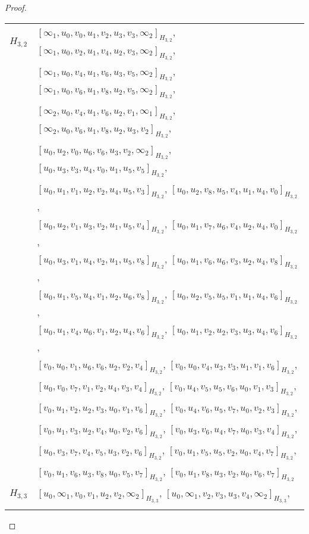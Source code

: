 \begin{subappendices}
\begin{proof}
{ \small
\begin{longtable}{|c|l|}
\hline
$H_{3,2}$ &
  $[\infty_1, u_0, v_0, u_1, v_2, u_3, v_3, \infty_2]_{H_{3,2}}$,
  $[\infty_1, u_0, v_2, u_1, v_4, u_2, v_3, \infty_2]_{H_{3,2}}$, \\* &
  $[\infty_1, u_0, v_4, u_1, v_6, u_3, v_5, \infty_2]_{H_{3,2}}$,
  $[\infty_1, u_0, v_6, u_1, v_8, u_2, v_5, \infty_2]_{H_{3,2}}$, \\* &
  $[\infty_2, u_0, v_4, u_1, v_6, u_2, v_1, \infty_1]_{H_{3,2}}$,
  $[\infty_2, u_0, v_6, u_1, v_8, u_2, u_3, v_2]_{H_{3,2}}$, \\* &
  $[u_0, u_2, v_0, u_6, v_6, u_3, v_2, \infty_2]_{H_{3,2}}$,
  $[u_0, u_3, v_3, u_4, v_0, u_1, u_5, v_5]_{H_{3,2}}$, \\* &
  $[u_0, u_1, v_1, u_2, v_2, u_4, u_5, v_3]_{H_{3,2}}$,
  $[u_0, u_2, v_8, u_5, v_4, u_1, u_4, v_0]_{H_{3,2}}$, \\* &
  $[u_0, u_2, v_1, u_3, v_2, u_1, u_5, v_4]_{H_{3,2}}$,
  $[u_0, u_1, v_7, u_6, v_4, u_2, u_4, v_0]_{H_{3,2}}$, \\* &
  $[u_0, u_3, v_1, u_4, v_2, u_1, u_5, v_8]_{H_{3,2}}$,
  $[u_0, u_1, v_6, u_6, v_3, u_2, u_4, v_8]_{H_{3,2}}$, \\* &
  $[u_0, u_1, v_5, u_4, v_1, u_2, u_6, v_8]_{H_{3,2}}$,
  $[u_0, u_2, v_5, u_5, v_1, u_1, u_4, v_6]_{H_{3,2}}$, \\* &
  $[u_0, u_1, v_4, u_6, v_1, u_2, u_4, v_6]_{H_{3,2}}$,
  $[u_0, u_1, v_2, u_2, v_3, u_3, u_4, v_6]_{H_{3,2}}$, \\* &
  $[v_0, u_0, v_1, u_6, v_6, u_2, v_2, v_4]_{H_{3,2}}$,
  $[v_0, u_0, v_4, u_3, v_3, u_1, v_1, v_6]_{H_{3,2}}$, \\* &
  $[u_0, v_0, v_7, v_1, v_2, u_4, v_3, v_4]_{H_{3,2}}$,
  $[v_0, u_4, v_5, u_5, v_6, u_0, v_1, v_3]_{H_{3,2}}$, \\* &
  $[v_0, u_1, v_2, u_2, v_3, u_0, v_1, v_6]_{H_{3,2}}$,
  $[v_0, u_4, v_6, u_5, v_7, u_0, v_2, v_3]_{H_{3,2}}$, \\* &
  $[v_0, u_1, v_3, u_2, v_4, u_0, v_2, v_6]_{H_{3,2}}$,
  $[v_0, u_3, v_6, u_4, v_7, u_0, v_3, v_4]_{H_{3,2}}$, \\* &
  $[u_0, v_3, v_7, v_4, v_5, u_3, v_2, v_6]_{H_{3,2}}$,
  $[v_0, u_1, v_5, u_5, v_2, u_0, v_4, v_7]_{H_{3,2}}$, \\* &
  $[v_0, u_1, v_6, u_3, v_8, u_0, v_5, v_7]_{H_{3,2}}$,
  $[v_0, u_1, v_8, u_3, v_2, u_0, v_6, v_7]_{H_{3,2}}$
\\ \hline
$H_{3,3}$ &
  $[u_0, \infty_1, v_0, v_1, u_2, v_2, \infty_2]_{H_{3,3}}$,
  $[u_0, \infty_1, v_2, v_3, u_3, v_4, \infty_2]_{H_{3,3}}$, \\* &

\end{longtable}}
\end{proof}
\end{subappendices}
